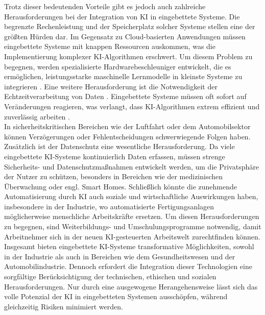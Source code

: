 Trotz dieser bedeutenden Vorteile gibt es jedoch auch zahlreiche Herausforderungen bei der Integration von KI in eingebettete Systeme. Die begrenzte Rechenleistung und der Speicherplatz solcher Systeme stellen eine der größten Hürden dar. Im Gegensatz zu Cloud-basierten Anwendungen müssen eingebettete Systeme mit knappen Ressourcen auskommen, was die Implementierung komplexer KI-Algorithmen erschwert. Um diesem Problem zu begegnen, werden spezialisierte Hardwarebeschleuniger entwickelt, die es ermöglichen, leistungsstarke maschinelle Lernmodelle in kleinste Systeme zu integrieren \cite{Gembaczka.2019}. Eine weitere Herausforderung ist die Notwendigkeit der Echtzeitverarbeitung von Daten \cite{Mazzia.2020}. Eingebettete Systeme müssen oft sofort auf Veränderungen reagieren, was verlangt, dass KI-Algorithmen extrem effizient und zuverlässig arbeiten \cite{Mazzia.2020}.\\
In sicherheitskritischen Bereichen wie der Luftfahrt oder dem Automobilsektor können Verzögerungen oder Fehlentscheidungen schwerwiegende Folgen haben.
Zusätzlich ist der Datenschutz eine wesentliche Herausforderung. Da viele eingebettete KI-Systeme kontinuierlich Daten erfassen, müssen strenge Sicherheits- und Datenschutzmaßnahmen entwickelt werden, um die Privatsphäre der Nutzer zu schützen, besonders in Bereichen wie der medizinischen Überwachung oder engl. Smart Homes. Schließlich könnte die zunehmende Automatisierung durch KI auch soziale und wirtschaftliche Auswirkungen haben, insbesondere in der Industrie, wo automatisierte Fertigungsanlagen möglicherweise menschliche Arbeitskräfte ersetzen. Um diesen Herausforderungen zu begegnen, sind Weiterbildungs- und Umschulungsprogramme notwendig, damit Arbeitnehmer sich in der neuen KI-gesteuerten Arbeitswelt zurechtfinden können.
Insgesamt bieten eingebettete KI-Systeme transformative Möglichkeiten, sowohl in der Industrie als auch in Bereichen wie dem Gesundheitswesen und der Automobilindustrie. Dennoch erfordert die Integration dieser Technologien eine sorgfältige Berücksichtigung der technischen, ethischen und sozialen Herausforderungen. Nur durch eine ausgewogene Herangehensweise lässt sich das volle Potenzial der KI in eingebetteten Systemen ausschöpfen, während gleichzeitig Risiken minimiert werden.







